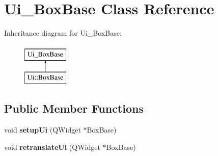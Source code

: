 \hypertarget{class_ui___box_base}{}\section{Ui\+\_\+\+Box\+Base Class Reference}
\label{class_ui___box_base}
Inheritance diagram for Ui\+\_\+\+Box\+Base\+:\begin{figure}[H]
\begin{center}
\leavevmode
\includegraphics[height=2.000000cm]{class_ui___box_base}
\end{center}
\end{figure}
\subsection*{Public Member Functions}
\begin{DoxyCompactItemize}
\item 
\mbox{\label{class_ui___box_base_a95be9d705bed42a4fe84584728b55042}} 
void {\bfseries setup\+Ui} (Q\+Widget $\ast$Box\+Base)
\item 
\mbox{\label{class_ui___box_base_a2efd497918d91e08c35215afa4b584cc}} 
void {\bfseries retranslate\+Ui} (Q\+Widget $\ast$Box\+Base)
\end{DoxyCompactItemize}
